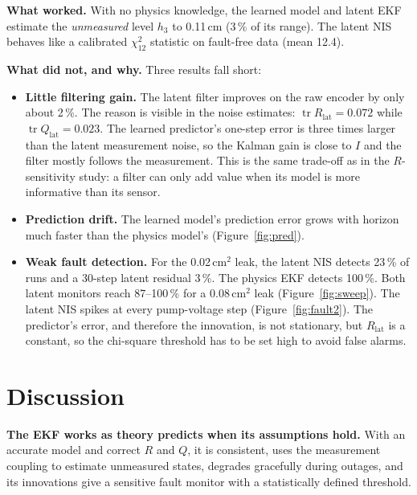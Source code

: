 \documentclass[11pt]{article}
\begin{document}
\textbf{What worked.} With no physics knowledge, the learned model and latent EKF estimate the \emph{unmeasured} level $h_3$ to 0.11\,cm (3\,\% of its range). The latent NIS behaves like a calibrated $\chi^2_{12}$ statistic on fault-free data (mean 12.4).

\textbf{What did not, and why.} Three results fall short:
\begin{itemize}\itemsep0pt
\item \textbf{Little filtering gain.} The latent filter improves on the raw encoder by only about 2\,\%. The reason is visible in the noise estimates: $\operatorname{tr}R_{\text{lat}}=0.072$ while $\operatorname{tr}Q_{\text{lat}}=0.023$. The learned predictor's one-step error is three times larger than the latent measurement noise, so the Kalman gain is close to $I$ and the filter mostly follows the measurement. This is the same trade-off as in the $R$-sensitivity study: a filter can only add value when its model is more informative than its sensor.
\item \textbf{Prediction drift.} The learned model's prediction error grows with horizon much faster than the physics model's (Figure~\ref{fig:pred}).
\item \textbf{Weak fault detection.} For the 0.02\,cm$^2$ leak, the latent NIS detects 23\,\% of runs and a 30-step latent residual 3\,\%. The physics EKF detects 100\,\%. Both latent monitors reach 87--100\,\% for a 0.08\,cm$^2$ leak (Figure~\ref{fig:sweep}). The latent NIS spikes at every pump-voltage step (Figure~\ref{fig:fault2}). The predictor's error, and therefore the innovation, is not stationary, but $R_{\text{lat}}$ is a constant, so the chi-square threshold has to be set high to avoid false alarms.
\end{itemize}

\section{Discussion}
\textbf{The EKF works as theory predicts when its assumptions hold.} With an accurate model and correct $R$ and $Q$, it is consistent, uses the measurement coupling to estimate unmeasured states, degrades gracefully during outages, and its innovations give a sensitive fault monitor with a statistically defined threshold.
\end{document}

